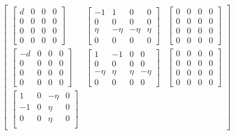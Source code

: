 \documentclass[11pt]{article} %
\begin{document}
\begin{align}  
    \begin{bmatrix}
         \begin{bmatrix}
            d & 0 & 0 & 0\\
            0 & 0  & 0 & 0\\
            0 & 0 & 0 & 0\\
            0 & 0 & 0 & 0
        \end{bmatrix}  & 
        \begin{bmatrix}
            -1 & 1 & 0  & 0\\
            0 & 0 & 0 & 0\\
            \eta & -\eta & -\eta  & \eta\\
            0 & 0 & 0 & 0
        \end{bmatrix}  &
        \begin{bmatrix}
            0 & 0 & 0 & 0\\
            0 & 0 & 0 & 0\\
            0 & 0 & 0 & 0\\
            0 & 0 & 0 & 0
        \end{bmatrix} \\
        \begin{bmatrix}
            -d & 0 & 0 & 0\\
            0 & 0  & 0 & 0\\
            0 & 0 & 0 & 0\\
            0 & 0 & 0 & 0
        \end{bmatrix}  & 
        \begin{bmatrix}
            1 & -1 & 0  & 0\\
            0 & 0 & 0 & 0\\
            -\eta & \eta & \eta  & -\eta\\
            0 & 0 & 0 & 0
        \end{bmatrix}  &
        \begin{bmatrix}
            0 & 0 & 0 & 0\\
            0 & 0 & 0 & 0\\
            0 & 0 & 0 & 0\\
            0 & 0 & 0 & 0
        \end{bmatrix} \\
        \begin{bmatrix}
            1 & 0 & -\eta  & 0\\
            -1 & 0 & \eta & 0\\
            0 & 0 & \eta & 0\\

\end{bmatrix}
\end{bmatrix}
\end{align}
\end{document}
